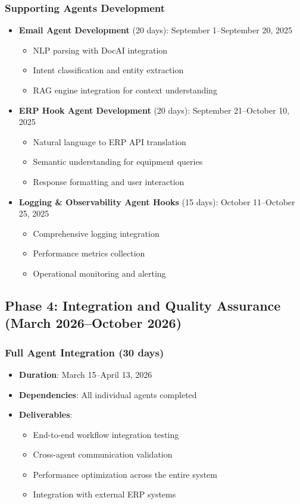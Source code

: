 \documentclass[12pt]{report}
\begin{document}
\subsubsection{Supporting Agents Development}
\begin{itemize}
  \item \textbf{Email Agent Development} (20 days): September 1--September 20, 2025
    \begin{itemize}
      \item NLP parsing with DocAI integration
      \item Intent classification and entity extraction
      \item RAG engine integration for context understanding
    \end{itemize}
  \item \textbf{ERP Hook Agent Development} (20 days): September 21--October 10, 2025
    \begin{itemize}
      \item Natural language to ERP API translation
      \item Semantic understanding for equipment queries
      \item Response formatting and user interaction
    \end{itemize}
  \item \textbf{Logging \& Observability Agent Hooks} (15 days): October 11--October 25, 2025
    \begin{itemize}
      \item Comprehensive logging integration
      \item Performance metrics collection
      \item Operational monitoring and alerting
    \end{itemize}
\end{itemize}

\subsection{Phase 4: Integration and Quality Assurance (March 2026--October 2026)}

\subsubsection{Full Agent Integration (30 days)}
\begin{itemize}
  \item \textbf{Duration}: March 15--April 13, 2026
  \item \textbf{Dependencies}: All individual agents completed
  \item \textbf{Deliverables}:
    \begin{itemize}
      \item End-to-end workflow integration testing
      \item Cross-agent communication validation
      \item Performance optimization across the entire system
      \item Integration with external ERP systems
    \end{itemize}
\end{itemize}
\end{document}
